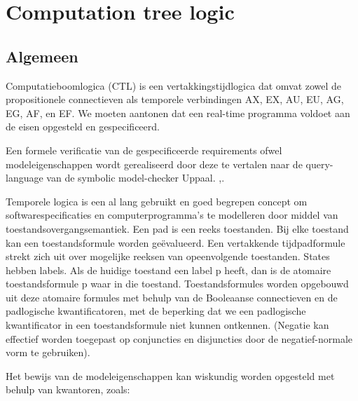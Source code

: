 \documentclass{article}
\begin{document}
	\section{Computation tree logic}
	
	\subsection{Algemeen}
	Computatieboomlogica (CTL) is een vertakkingstijdlogica
	dat omvat zowel de propositionele connectieven als
	temporele verbindingen AX, EX, AU, EU, AG, EG, AF,
	en EF.
%	
	We moeten aantonen dat een real-time programma voldoet aan de eisen opgesteld en gespecificeerd. 

Een formele verificatie van de gespecificeerde requirements ofwel modeleigenschappen wordt gerealiseerd door deze te vertalen naar de query-language van de symbolic model-checker Uppaal.  \cite{alurSystemClok},\cite{alurModelHybrid}.

Temporele logica is een al lang gebruikt en goed begrepen concept om softwarespecificaties en computerprogramma's te modelleren door middel van toestandsovergangsemantiek.
Een pad is een reeks toestanden. Bij elke toestand kan een toestandsformule worden geëvalueerd. Een vertakkende tijdpadformule strekt zich uit over mogelijke reeksen van opeenvolgende toestanden.
States hebben labels. Als de huidige toestand een label p heeft, dan is de atomaire toestandsformule p waar in die toestand. Toestandsformules worden opgebouwd uit deze atomaire formules met behulp van de Booleaanse connectieven en de padlogische kwantificatoren, met de beperking dat we een padlogische kwantificator in een toestandsformule niet kunnen ontkennen. (Negatie kan effectief worden toegepast op conjuncties en disjuncties door de negatief-normale vorm te gebruiken).

Het bewijs van de modeleigenschappen kan wiskundig worden opgesteld met behulp van kwantoren, zoals:
\end{document}
